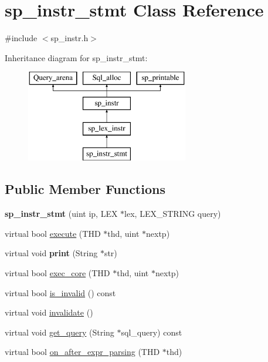 \hypertarget{classsp__instr__stmt}{}\section{sp\+\_\+instr\+\_\+stmt Class Reference}
\label{classsp__instr__stmt}


{\ttfamily \#include $<$sp\+\_\+instr.\+h$>$}

Inheritance diagram for sp\+\_\+instr\+\_\+stmt\+:\begin{figure}[H]
\begin{center}
\leavevmode
\includegraphics[height=4.000000cm]{classsp__instr__stmt}
\end{center}
\end{figure}
\subsection*{Public Member Functions}
\begin{DoxyCompactItemize}
\item 
\mbox{\label{classsp__instr__stmt_a454b6f577c3de305c88f5897e383a7bd}} 
{\bfseries sp\+\_\+instr\+\_\+stmt} (uint ip, L\+EX $\ast$lex, L\+E\+X\+\_\+\+S\+T\+R\+I\+NG query)
\item 
virtual bool \mbox{\hyperlink{classsp__instr__stmt_a81682f344607fafa2bdac0075b636d85}{execute}} (T\+HD $\ast$thd, uint $\ast$nextp)
\item 
\mbox{\label{classsp__instr__stmt_ae4617130101e53067ebb221ac7c066bc}} 
virtual void {\bfseries print} (String $\ast$str)
\item 
virtual bool \mbox{\hyperlink{classsp__instr__stmt_a10255fd8768c13b35a715b78aac47b3f}{exec\+\_\+core}} (T\+HD $\ast$thd, uint $\ast$nextp)
\item 
virtual bool \mbox{\hyperlink{classsp__instr__stmt_aeadeb9c91a52db353dceab5586ed511e}{is\+\_\+invalid}} () const
\item 
virtual void \mbox{\hyperlink{classsp__instr__stmt_a15924975452f322b5d8216b3b8279988}{invalidate}} ()
\item 
virtual void \mbox{\hyperlink{classsp__instr__stmt_a271adfe3156abe2c56cb3b65f9265eb9}{get\+\_\+query}} (String $\ast$sql\+\_\+query) const
\item 
virtual bool \mbox{\hyperlink{classsp__instr__stmt_a2918355010fb4072cd4eba8628fe931e}{on\+\_\+after\+\_\+expr\+\_\+parsing}} (T\+HD $\ast$thd)
\end{DoxyCompactItemize}
